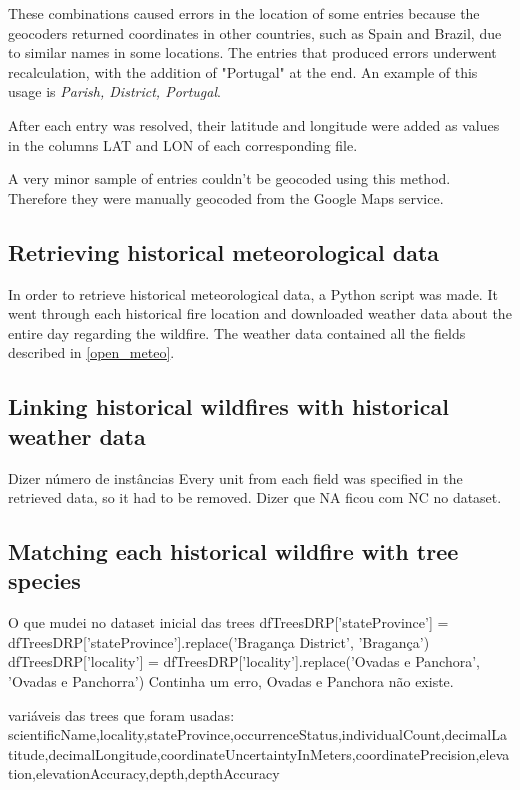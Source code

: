 These combinations caused errors in the location of some entries because the geocoders returned coordinates in other countries, such as Spain and Brazil, due to similar names in some locations. The entries that produced errors underwent recalculation, with the addition of "Portugal" at the end. An example of this usage is  {\it Parish, District, Portugal}.

After each entry was resolved, their latitude and longitude were added as values in the columns LAT and LON of each corresponding file.


A very minor sample of entries couldn't be geocoded using this method. Therefore they were manually geocoded from the Google Maps service. 



\subsection{Retrieving historical meteorological data}
In order to retrieve historical meteorological data, a Python script was made. It went through each historical fire location and downloaded weather data about the entire day regarding the wildfire. The weather data contained all the fields described in \ref{open_meteo}. 



\subsection{Linking historical wildfires with historical weather data}
Dizer número de instâncias
Every unit from each field was specified in the retrieved data, so it had to be removed.
Dizer que NA ficou com NC no dataset.




\subsection{Matching each historical wildfire with tree species}
\label{tree_species_wildfires}


O que mudei no dataset inicial das trees
dfTreesDRP['stateProvince'] = dfTreesDRP['stateProvince'].replace('Bragança District', 'Bragança')
dfTreesDRP['locality'] = dfTreesDRP['locality'].replace('Ovadas e Panchora', 'Ovadas e Panchorra')
Continha um erro, Ovadas e Panchora não existe.


variáveis das trees que foram usadas: scientificName,locality,stateProvince,occurrenceStatus,individualCount,decimalLatitude,decimalLongitude,coordinateUncertaintyInMeters,coordinatePrecision,elevation,elevationAccuracy,depth,depthAccuracy


